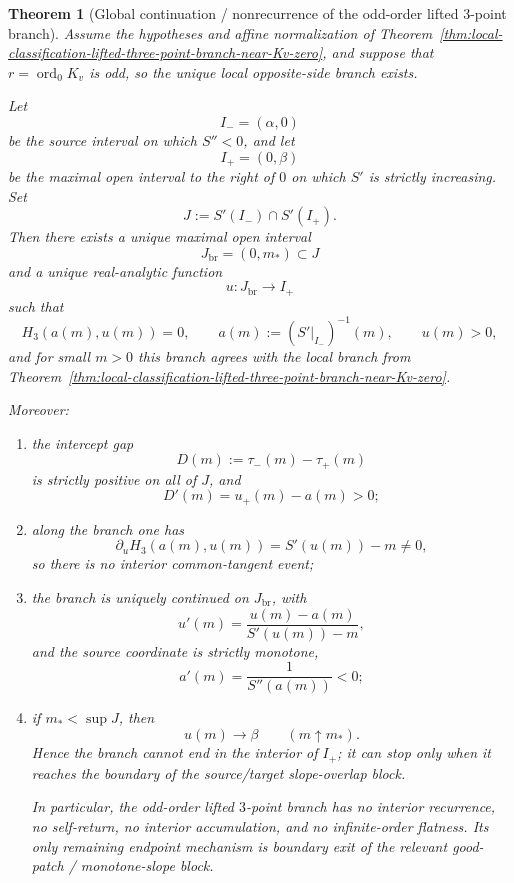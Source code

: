 \documentclass[11pt,a4paper]{amsart}
\theoremstyle{plain}
\newtheorem{theorem}{Theorem}[section]
\theoremstyle{definition}
\begin{document}
\begin{theorem}[Global continuation / nonrecurrence of the odd-order lifted $3$-point branch]
\label{thm:global-continuation-nonrecurrence-odd-three-point-branch}
Assume the hypotheses and affine normalization of
Theorem~\ref{thm:local-classification-lifted-three-point-branch-near-Kv-zero},
and suppose that $r=\operatorname{ord}_0K_v$ is odd, so the unique local
opposite-side branch exists.

Let
\[
I_-=(\alpha,0)
\]
be the source interval on which $S''<0$, and let
\[
I_+=(0,\beta)
\]
be the maximal open interval to the right of $0$ on which $S'$ is strictly
increasing. Set
\[
J:=S'(I_-)\cap S'(I_+).
\]
Then there exists a unique maximal open interval
\[
J_{\mathrm{br}}=(0,m_*)\subset J
\]
and a unique real-analytic function
\[
u:J_{\mathrm{br}}\to I_+
\]
such that
\[
H_3(a(m),u(m))=0,
\qquad
a(m):=(S'|_{I_-})^{-1}(m),
\qquad
u(m)>0,
\]
and for small $m>0$ this branch agrees with the local branch from
Theorem~\ref{thm:local-classification-lifted-three-point-branch-near-Kv-zero}.

Moreover:
\begin{enumerate}
\item the intercept gap
\[
D(m):=\tau_-(m)-\tau_+(m)
\]
is strictly positive on all of $J$, and
\[
D'(m)=u_+(m)-a(m)>0;
\]

\item along the branch one has
\[
\partial_u H_3(a(m),u(m))
=
S'(u(m))-m
\neq 0,
\]
so there is no interior common-tangent event;

\item the branch is uniquely continued on $J_{\mathrm{br}}$, with
\[
u'(m)=\frac{u(m)-a(m)}{S'(u(m))-m},
\]
and the source coordinate is strictly monotone,
\[
a'(m)=\frac{1}{S''(a(m))}<0;
\]

\item if $m_*<\sup J$, then
\[
u(m)\longrightarrow \beta
\qquad (m\uparrow m_*).
\]
Hence the branch cannot end in the interior of $I_+$; it can stop only when it
reaches the boundary of the source/target slope-overlap block.

In particular, the odd-order lifted $3$-point branch has no interior
recurrence, no self-return, no interior accumulation, and no infinite-order
flatness. Its only remaining endpoint mechanism is boundary exit of the
relevant good-patch / monotone-slope block.
\end{enumerate}
\end{theorem}
\end{document}
